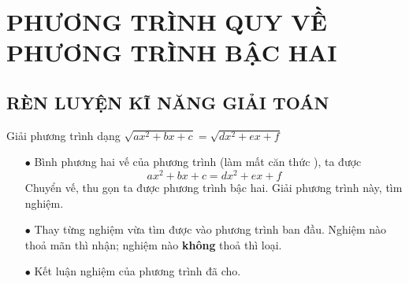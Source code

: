 \section{PHƯƠNG TRÌNH QUY VỀ PHƯƠNG TRÌNH BẬC HAI}

\subsection{RÈN LUYỆN KĨ NĂNG GIẢI TOÁN}
\begin{dang}{Giải phương trình dạng $\sqrt{ax^2+bx+c}=\sqrt{dx^2+ex+f}$}
	\begin{itemize}
		\item [$\bullet$] Bình phương hai vế của phương trình (làm mất căn thức ), ta được
		$$ax^2+bx+c=dx^2+ex+f$$
		Chuyển vế, thu gọn ta được phương trình bậc hai. Giải phương trình này, tìm nghiệm.
		\item [$\bullet$] Thay từng nghiệm vừa tìm được vào phương trình ban đầu. Nghiệm nào thoả mãn thì nhận; nghiệm nào \textbf{không} thoả thì loại.
		\item [$\bullet$] Kết luận nghiệm của phương trình đã cho.
	\end{itemize}
\end{dang}

